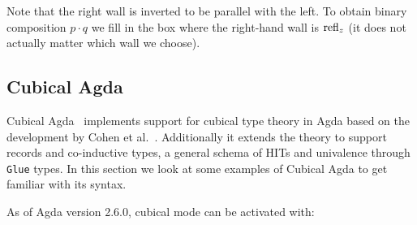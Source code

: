 Note that the right wall is inverted to be parallel with the left.
To obtain binary composition $p \cdot q$ we fill in the box where the right-hand
wall is $\operatorname{refl}_z$ (it does not actually matter which wall we choose).

\subsection{Cubical Agda}
Cubical Agda~\cite{vezzosi2021cubical} implements support for cubical type
theory in Agda based on the development by Cohen et al.~\cite{cohen2016cubical}.
Additionally it extends the theory to support records and co-inductive types, a
general schema of HITs and univalence through \texttt{Glue} types. In this
section we look at some examples of Cubical Agda to get familiar with its
syntax.

As of Agda version 2.6.0, cubical mode can be activated with:
\begin{code}%
\>[0]\AgdaSymbol{\{-\#}\AgdaSpace{}%
\AgdaSpace{}%
\AgdaSpace{}%
\AgdaSymbol{\#-\}}\<%
\end{code}

